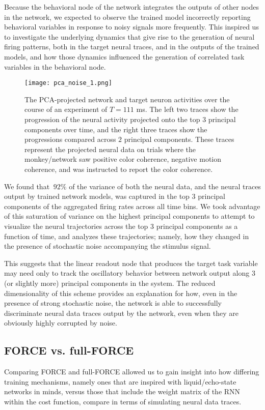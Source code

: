 \documentclass[12pt,a4paper,final]{iopart}
\begin{document}
Because the behavioral node of the network integrates the outputs of other nodes in the network, we expected to observe the trained model incorrectly reporting behavioral variables in response to noisy signals more frequently. This inspired us to investigate the underlying dynamics that give rise to the generation of neural firing patterns, both in the target neural traces, and in the outputs of the trained models, and how those dynamics influenced the generation of correlated task variables in the behavioral node. 
\begin{figure}[t]
 \centering
 \texttt{[image: pca\_noise\_1.png]}
 \caption{The PCA-projected network and target neuron activities over the course of an experiment of $T = 111$ ms. The left two traces show the progression of the neural activity projected onto the top $3$ principal components over time, and the right three traces show the progressions compared across $2$ principal components. These traces represent the projected neural data on trials where the monkey/network saw positive color coherence, negative motion coherence, and was instructed to report the color coherence.}
\end{figure}

We found that $~92\%$ of the variance of both the neural data, and the neural traces output by trained network models, was captured in the top $3$ principal components of the aggregated firing rates across all time bins. We took advantage of this saturation of variance on the highest principal components to attempt to visualize the neural trajectories across the top $3$ principal components as a function of time, and analyzes these trajectories; namely, how they changed in the presence of stochastic noise accompanying the stimulus signal.

This suggests that the linear readout node that produces the target task variable may need only to track the oscillatory behavior between network output along $3$ (or slightly more) principal components in the system. The reduced dimensionality of this scheme provides an explanation for how, even in the presence of strong stochastic noise, the network is able to successfully discriminate neural data traces output by the network, even when they are obviously highly corrupted by noise.

\subsection{FORCE vs. full-FORCE}
Comparing FORCE and full-FORCE allowed us to gain insight into how differing training mechanisms, namely ones that are inspired with liquid/echo-state networks in minds, versus those that include the weight matrix of the RNN within the cost function, compare in terms of simulating neural data traces.
\end{document}
